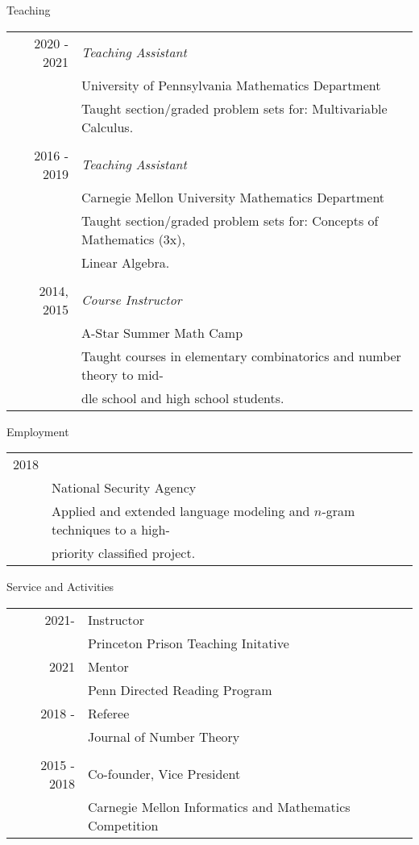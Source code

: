 \documentclass{article}
\begin{document}
\newpage
\Large{Teaching}\vspace{0.2in}\\
\normalsize
\begin{tabular}{r l}
	2020 - 2021 & \textit{Teaching Assistant}\\
	& University of Pennsylvania Mathematics Department\\
	& \small{Taught section/graded problem sets for: Multivariable Calculus.} \normalsize\\
	&\\
	2016 - 2019 & \textit{Teaching Assistant}\\
	& Carnegie Mellon University Mathematics Department\\
	& \small{Taught section/graded problem sets for: Concepts of Mathematics (3x),}\\
	& \small{Linear Algebra.} \normalsize\\
	&\\
	2014, 2015 & \textit{Course Instructor}\\
	& A-Star Summer Math Camp\\
	& \small{Taught courses in elementary combinatorics and number theory to mid-}\\
	& \small{dle school and high school students}.
\end{tabular}

\vspace{0.25in}
\Large{Employment}\vspace{0.2in}\\
\normalsize
\begin{tabular}{r l}
	2018 & \text{Research Intern}\\
	& National Security Agency\\
	&\small{Applied and extended language modeling and $n$-gram techniques to a high-}\\
	&\small{priority classified project.}
\end{tabular}

\vspace{0.25in}
\Large{Service and Activities}\vspace{0.2in}\\
\normalsize
\begin{tabular}{r l}
	2021- & Instructor\\
	& Princeton Prison Teaching Initative
	&\\
	2021 & Mentor\\
	& Penn Directed Reading Program
	&\\
	2018 - & Referee\\
	& Journal of Number Theory\\
	&\\
	2015 - 2018 & Co-founder, Vice President\\
	& Carnegie Mellon Informatics and Mathematics Competition
\end{tabular}
\end{document}
